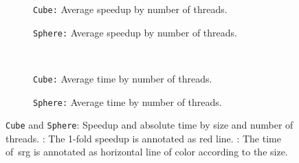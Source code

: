 \documentclass{article}
\begin{document}

\begin{figure}[!ht]
  \begin{subfigure}{0.5\textwidth}%
    \caption{\texttt{Cube:} Average speedup by number of threads.}\label{fig:cubespeedup}
  \end{subfigure}%
  \begin{subfigure}{0.5\textwidth}%
    \caption{\texttt{Sphere:} Average speedup by number of threads.}\label{fig:spherespeedup}
  \end{subfigure}%
\\
  \begin{subfigure}{0.5\textwidth}%
    \caption{\texttt{Cube:} Average time by number of threads.}\label{fig:cubetime}
  \end{subfigure}%
  \begin{subfigure}{0.5\textwidth}%
    \caption{\texttt{Sphere:} Average time by number of threads.}\label{fig:spheretime}
  \end{subfigure}%
  \caption{\texttt{Cube} and \texttt{Sphere}: Speedup and absolute time by size and number of threads.
  : The 1-fold speedup is annotated as red line.
  : The time of~\ac{srg} is annotated as horizontal line of color according to the size.}
  \label{fig:cubesphere_speeduptime}
\end{figure}%
\end{document}
